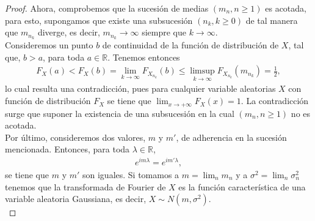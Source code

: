 \begin{proof}
Ahora, comprobemos que la sucesión de medias $(m_n, n \geq 1)$ es acotada, para esto, supongamos que existe una subsucesión $(n_k, k \geq 0)$ de tal manera que $m_{n_k}$ diverge, es decir, $m_{n_k} \rightarrow \infty$ siempre que $k \rightarrow \infty$. \\ 

Consideremos un punto $b$ de continuidad de la función de distribución de $X$, tal que, $b > a$, para toda $a \in \mathbb{R}$. Tenemos entonces
	\begin{align*}
	F_X (a) < F_X (b) = \lim_{k \rightarrow \infty} F_{X_{n_k}} (b) \leq \limsup_{k \rightarrow \infty} F_{X_{n_k}} (m_{n_k}) = \frac{1}{2}, 
	\end{align*}
lo cual resulta una contradicción, pues para cualquier variable aleatorias $X$ con función de distribución $F_X$ se tiene que $\lim_{x \rightarrow + \infty} F_X (x) = 1$. La contradicción surge que suponer la existencia de una subsucesión en la cual $(m_n, n \geq 1)$ no es acotada. \\

Por último, consideremos dos valores, $m$ y $m'$, de adherencia en la sucesión mencionada. Entonces, para toda $\lambda \in \mathbb{R}$, 
	\begin{align*}
	e^{i m \lambda} = e^{i m' \lambda},
	\end{align*}
se tiene que $m$ y $m'$ son iguales. Si tomamos a $m = \lim_n m_n$ y a $\sigma^2 = \lim_n \sigma_n^2$ tenemos que la transformada de Fourier de $X$ es la función característica de una variable aleatoria Gaussiana, es decir, $X \sim N(m, \sigma^2)$. \\


\end{proof}

